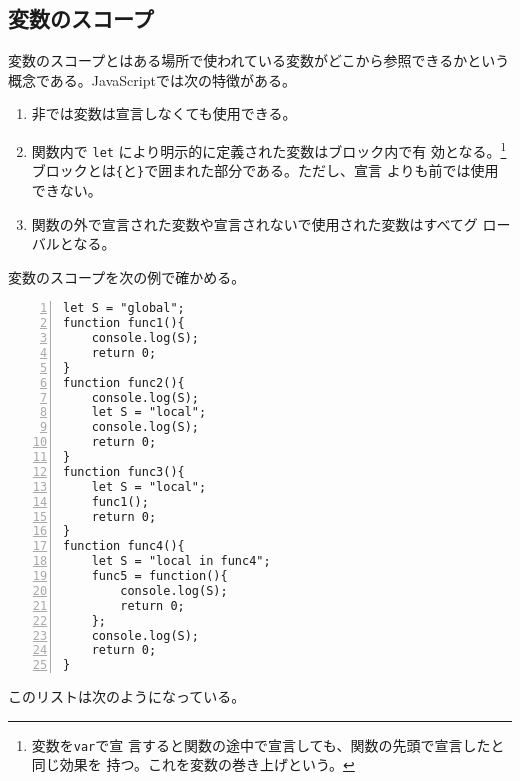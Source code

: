 \subsection{変数のスコープ}
変数のスコープとはある場所で使われている変数がどこから参照できるかという
概念である。JavaScriptでは次の特徴がある。
\begin{enumerate}
 \item 非\Strict では変数は宣言しなくても使用できる。\label{3-4NoDeclare}
 \item 関数内で \Verb+let+ により明示的に定義された変数はブロック内で有
       効となる。\label{3-4DeclareInFunc}\footnote{変数を\Verb+var+で宣
       言すると関数の途中で宣言しても、関数の先頭で宣言したと同じ効果を
       持つ。これを変数の巻き上げという。}
       ブロックとは\Verb+{+と\Verb+}+で囲まれた部分である。ただし、宣言
       よりも前では使用できない。
 \item 関数の外で宣言された変数や宣言されないで使用された変数はすべてグ
       ローバルとなる。\label{3-4Declare2}
\end{enumerate}
\begin{Exec}\label{ExecScope}\upshape
変数のスコープを次の例で確かめる。
\begin{Verbatim}[numbers=left]
let S = "global";
function func1(){
    console.log(S);
    return 0;
}
function func2(){
    console.log(S);
    let S = "local";
    console.log(S);
    return 0;
}
function func3(){
    let S = "local";
    func1();
    return 0;
}
function func4(){
    let S = "local in func4";
    func5 = function(){
        console.log(S);
        return 0;
    };
    console.log(S);
    return 0;
}
\end{Verbatim}
\end{Exec}
このリストは次のようになっている。
